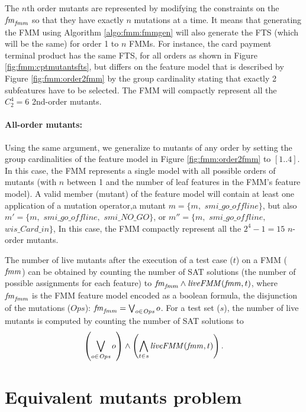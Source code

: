 The $n$th order mutants are represented by modifying the constraints on the $\mathit{fm}_{\mathit{fmm}}$ so that they have exactly $n$ mutations at a time. It means that generating the FMM using Algorithm \ref{algo:fmm:fmmgen} will also generate the FTS (which will be the same) for order 1 to $n$ FMMs. For instance, the card payment terminal product has the same FTS, for all orders as shown in Figure \ref{fig:fmm:cptmutantsfts}, but differs on the feature model that is described by Figure \ref{fig:fmm:order2fmm} by the group cardinality stating that exactly 2 subfeatures have to be selected. The FMM will compactly represent all the $C^{4}_{2} = 6$ 2nd-order mutants.

\paragraph{All-order mutants:} 

Using the same argument, we generalize to mutants of any order by setting the group cardinalities of the feature model in Figure \ref{fig:fmm:order2fmm} to  $[1..4]$. In this case, the FMM represents a single model with all possible orders of mutants (with $n$ between 1 and the number of leaf features in the FMM's feature model). A valid member (mutant) of the feature model will contain at least one application of a mutation operator,\eg a mutant $m = \{m,$ $\mathit{smi\_go\_offline}\}$, but also  $m' = \{m,$ $\mathit{smi\_go\_offline},$ $\mathit{smi\_NO\_GO}\}$, or $m'' = \{m,$ $\mathit{smi\_go\_offline},$ $\mathit{wis\_Card\_in}\}$, \etc In this case, the FMM compactly represent all the $2^{4} - 1 = 15$  $n$-order mutants.

The number of live mutants after the execution of a test case ($t$) on a FMM ($\mathit{fmm}$) can be obtained by counting the number of SAT solutions (\ie the number of possible assignments for each feature) to $\mathit{fm}_{\mathit{fmm}} \wedge \mathit{liveFMM}(\mathit{fmm}, t)$, where $\mathit{fm}_{\mathit{fmm}}$ is the FMM feature model encoded as a boolean formula, \ie the disjunction of the mutations ($\mathit{Ops}$): $\mathit{fm}_{\mathit{fmm}} = \bigvee_{o \in \mathit{Ops}} o$. For a test set ($s$), the number of live mutants is computed by counting the number of SAT solutions to
%
$$ \left(\bigvee_{o \in \mathit{Ops}} o \right) \wedge \left(\bigwedge_{t \in s} \mathit{liveFMM}(\mathit{fmm}, t) \right). $$


\section{Equivalent mutants problem}

